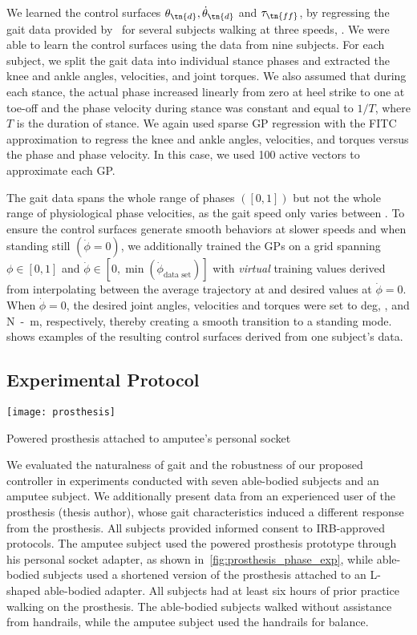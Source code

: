 We learned the control surfaces $\theta_\tn{d}, \dot{\theta}_\tn{d}$ and
$\tau_\tn{ff}$, by regressing the gait data provided
by~\citet{moore2015elaborate} for several subjects walking at three speeds,
. We were able to learn the control surfaces
using the data from nine subjects. For each subject, we split the gait data into
individual stance phases and extracted the knee and ankle angles, velocities,
and joint torques.  We also assumed that during each stance, the actual phase
increased linearly from zero at heel strike to one at toe-off and the phase
velocity during stance was constant and equal to $1/T$, where $T$ is the
duration of stance. We again used sparse GP regression with the FITC
approximation to regress the knee and ankle angles, velocities, and torques
versus the phase and phase velocity. In this case, we used 100 active vectors to
approximate each GP.\ 

The gait data spans the whole range of phases $([0, 1])$ but not the whole range
of physiological phase velocities, as the gait speed only varies between
. To ensure the control surfaces generate smooth
behaviors at slower speeds and when standing still $(\dot{\phi} = 0)$, we
additionally trained the GPs on a grid spanning $\phi \in [0, 1]$ and
$\dot{\phi} \in [0, \min(\dot{\phi}_\textrm{data set})]$ with \emph{virtual}
training values derived from interpolating between the average trajectory at
 and desired values at $\dot{\phi} = 0$. When $\dot{\phi} =
0$, the desired joint angles, velocities and torques were set to \unit[5]{deg},
, and \unit[0]{N-m},  respectively, thereby creating a
smooth transition to a standing mode.  shows examples of
the resulting control surfaces derived from one subject's data.

\subsection{Experimental Protocol}\label{sec:exp}

\begin{marginfigure}
    \centering
    \texttt{[image: prosthesis]}
    \caption{Powered prosthesis attached to amputee's personal
    socket}\label{fig:prosthesis_phase_exp} 
\end{marginfigure}

We evaluated the naturalness of gait and the robustness of our proposed
controller in experiments conducted with seven able-bodied subjects and an
amputee subject. We additionally present data from an experienced user of the
prosthesis (thesis author), whose gait characteristics induced a
different response from the prosthesis. All subjects provided informed consent
to IRB-approved protocols. The amputee subject used the powered prosthesis
prototype through his personal socket adapter, as shown
in~\cref{fig:prosthesis_phase_exp}, while able-bodied subjects used a shortened
version of the prosthesis attached to an L-shaped able-bodied adapter. All
subjects had at least six hours of prior practice walking on the prosthesis. The
able-bodied subjects walked without assistance from handrails, while the amputee
subject used the handrails for balance.

